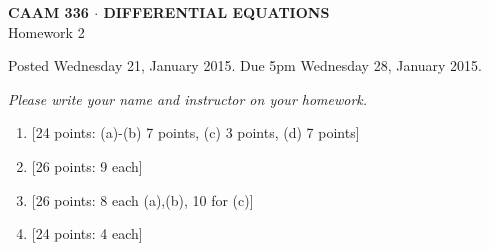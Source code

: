 \documentclass[10pt]{article}
\begin{document}
\newcommand{\pd}[3]{\frac{\partial^{#3} #1}{\partial #2^{#3}}}

\vspace*{-5em}
\begin{center}
\large \textsf{\textbf{CAAM 336 $\cdot$ DIFFERENTIAL EQUATIONS}\\[0.5em]
Homework 2 }
\end{center}

Posted Wednesday 21, January 2015.  Due 5pm Wednesday 28, January 2015.

\begin{center}
\emph{Please write your name and instructor on your homework.}
\end{center}

\begin{enumerate}
\item {[24 points: (a)-(b) 7 points, (c) 3 points, (d) 7 points]}  
\newpage
\item {[26 points: 9 each]}  
\newpage
\item {[26 points: 8 each (a),(b), 10 for (c)]}  
\vspace{1em}
\newpage
\item {[24 points: 4 each]}  

\end{enumerate}
\end{document}
